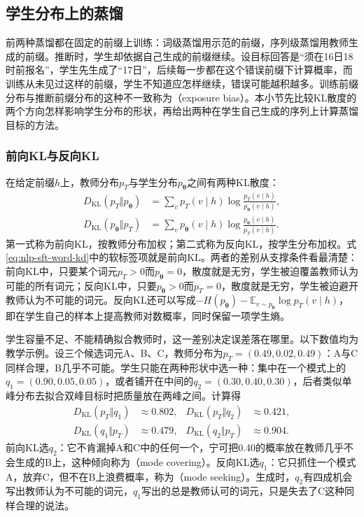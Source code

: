 \subsection{学生分布上的蒸馏}
\label{sec:nlp-sft-on-policy-distillation}

前两种蒸馏都在固定的前缀上训练：词级蒸馏用示范的前缀，序列级蒸馏用教师生成的前缀。推断时，学生却依据自己生成的前缀继续。设目标回答是“须在16日18时前报名”，学生先生成了“17日”，后续每一步都在这个错误前缀下计算概率，而训练从未见过这样的前缀，学生不知道应怎样继续，错误可能越积越多。训练前缀分布与推断前缀分布的这种不一致称为（exposure bias）。本小节先比较KL散度的两个方向怎样影响学生分布的形状，再给出两种在学生自己生成的序列上计算蒸馏目标的方法。

\subsubsection{前向KL与反向KL}
\label{sec:nlp-sft-kl-directions}

在给定前缀$h$上，教师分布$p_T$与学生分布$p_{\bm\theta}$之间有两种KL散度：
\begin{equation}
\label{eq:nlp-sft-kl-directions}
\begin{aligned}
 D_{\mathrm{KL}}(p_T\Vert p_{\bm{\theta}})
 &=\sum_v p_T(v\mid h)\log\frac{p_T(v\mid h)}{p_{\bm{\theta}}(v\mid h)},\\
 D_{\mathrm{KL}}(p_{\bm{\theta}}\Vert p_T)
 &=\sum_v p_{\bm{\theta}}(v\mid h)\log\frac{p_{\bm{\theta}}(v\mid h)}{p_T(v\mid h)}.
\end{aligned}
\end{equation}
第一式称为前向KL，按教师分布加权；第二式称为反向KL，按学生分布加权。式\eqref{eq:nlp-sft-word-kd}中的软标签项就是前向KL。两者的差别从支撑条件看最清楚：前向KL中，只要某个词元$p_T>0$而$p_{\bm\theta}=0$，散度就是无穷，学生被迫覆盖教师认为可能的所有词元；反向KL中，只要$p_{\bm\theta}>0$而$p_T=0$，散度就是无穷，学生被迫避开教师认为不可能的词元。反向KL还可以写成$-H(p_{\bm\theta})-\mathbb E_{v\sim p_{\bm\theta}}\log p_T(v\mid h)$，即在学生自己的样本上提高教师对数概率，同时保留一项学生熵。

学生容量不足、不能精确拟合教师时，这一差别决定误差落在哪里。以下数值均为教学示例。设三个候选词元A、B、C，教师分布为$p_T=(0.49,0.02,0.49)$：A与C同样合理，B几乎不可能。学生只能在两种形状中选一种：集中在一个模式上的$q_1=(0.90,0.05,0.05)$，或者铺开在中间的$q_2=(0.30,0.40,0.30)$，后者类似单峰分布去拟合双峰目标时把质量放在两峰之间。计算得
\[
\begin{aligned}
 D_{\mathrm{KL}}(p_T\Vert q_1)&\approx0.802, & D_{\mathrm{KL}}(p_T\Vert q_2)&\approx0.421,\\
 D_{\mathrm{KL}}(q_1\Vert p_T)&\approx0.479, & D_{\mathrm{KL}}(q_2\Vert p_T)&\approx0.904.
\end{aligned}
\]
前向KL选$q_2$：它不肯漏掉A和C中的任何一个，宁可把0.40的概率放在教师几乎不会生成的B上，这种倾向称为（mode covering）。反向KL选$q_1$：它只抓住一个模式A，放弃C，但不在B上浪费概率，称为（mode seeking）。生成时，$q_2$有四成机会写出教师认为不可能的词元，$q_1$写出的总是教师认可的词元，只是失去了C这种同样合理的说法。

